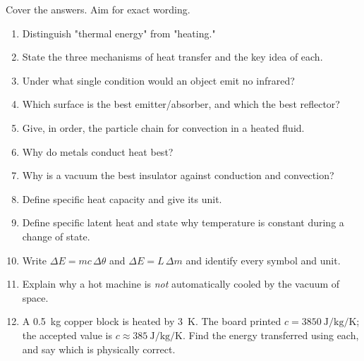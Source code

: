 \documentclass[11pt,a4paper]{article}
\newcommand{\dtheta}{\Delta\theta}
\newcommand{\dE}{\Delta E}
\begin{document}
Cover the answers. Aim for exact wording.

\begin{enumerate}[leftmargin=1.6em,itemsep=4pt]
\item Distinguish "thermal energy" from "heating."
\item State the three mechanisms of heat transfer and the key idea of each.
\item Under what single condition would an object emit no infrared?
\item Which surface is the best emitter/absorber, and which the best reflector?
\item Give, in order, the particle chain for convection in a heated fluid.
\item Why do metals conduct heat best?
\item Why is a vacuum the best insulator against conduction and convection?
\item Define specific heat capacity and give its unit.
\item Define specific latent heat and state why temperature is constant during a change of
      state.
\item Write $\dE=mc\,\dtheta$ and $\dE=L\,\Delta m$ and identify every symbol and unit.
\item Explain why a hot machine is \emph{not} automatically cooled by the vacuum of space.
\item A \SI{0.5}{\kilogram} copper block is heated by \SI{3}{\kelvin}. The board printed
      $c=\SI{3850}{\joule\per\kilogram\per\kelvin}$; the accepted value is
      $c\approx\SI{385}{\joule\per\kilogram\per\kelvin}$. Find the energy transferred using
      each, and say which is physically correct.
\end{enumerate}
\end{document}
